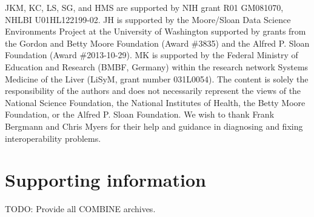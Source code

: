 \documentclass[10pt,letterpaper]{article}
\begin{document}
JKM, KC, LS, SG, and HMS are supported by NIH grant R01 GM081070, NHLBI U01HL122199-02. JH is supported by the Moore/Sloan Data Science Environments Project at the University of Washington supported by grants from the Gordon and Betty Moore Foundation (Award \#3835) and the Alfred P. Sloan Foundation (Award \#2013-10-29). MK is supported by the Federal Ministry of Education and Research (BMBF, Germany) within the research network Systems Medicine of the Liver (LiSyM, grant number 031L0054). The content is solely the responsibility of the authors and does not necessarily represent the views of the National Science Foundation, the National Institutes of Health, the Betty Moore Foundation, or the Alfred P. Sloan Foundation.
We wish to thank Frank Bergmann and Chris Myers for their help and guidance in diagnosing and fixing interoperability problems.

\section*{Supporting information}

TODO: Provide all COMBINE archives.




\end{document}

